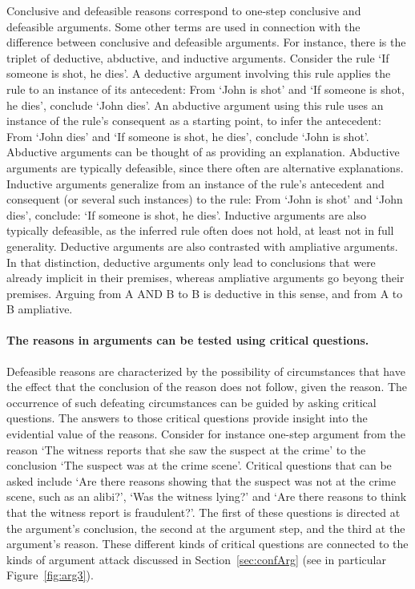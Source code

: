 \documentclass[10pt]{article}
\begin{document}
Conclusive and defeasible reasons correspond to one-step conclusive and defeasible arguments. Some other terms are used in connection with the difference between conclusive and defeasible arguments. For instance, there is the triplet of deductive, abductive, and inductive arguments. Consider the rule `If someone is shot, he dies'. A deductive argument involving this rule applies the rule to an instance of its antecedent: From `John is shot' and `If someone is shot, he dies', conclude `John dies'. An abductive argument using this rule uses an instance of the rule's consequent as a starting point, to infer the antecedent: From `John dies' and  `If someone is shot, he dies', conclude `John is shot'. Abductive arguments can be thought of as providing an explanation. Abductive arguments are typically defeasible, since there often are alternative explanations. Inductive arguments generalize from an instance of the rule's antecedent and consequent (or several such instances) to the rule: From `John is shot' and `John dies', conclude: `If someone is shot, he dies'. Inductive arguments are also typically defeasible, as the inferred rule often does not hold, at least not in full generality. Deductive arguments are also contrasted with ampliative arguments. In that distinction, deductive arguments only lead to conclusions that were already implicit in their premises, whereas ampliative arguments go beyong their premises. Arguing from A AND B to B is deductive in this sense, and from A to B ampliative.

\paragraph{The reasons in arguments can be tested using critical questions.} Defeasible reasons are characterized by the possibility of circumstances that have the effect that the conclusion of the reason does not follow, given the reason. The occurrence of such defeating circumstances can be guided by asking critical questions. The answers to those critical questions provide insight into the evidential value of the reasons. Consider for instance one-step argument from the reason `The witness reports that she saw the suspect at the crime' to the conclusion `The suspect was at the crime scene'. Critical questions that can be asked include `Are there reasons showing that the suspect was not at the crime scene, such as an alibi?', `Was the witness lying?' and `Are there reasons to think that the witness report is fraudulent?'. The first of these questions is directed at the argument's conclusion, the second at the argument step, and the third at the argument's reason. These different kinds of critical questions are connected to the kinds of argument attack discussed in Section~\ref{sec:confArg} (see in particular Figure~\ref{fig:arg3}).
\end{document}
